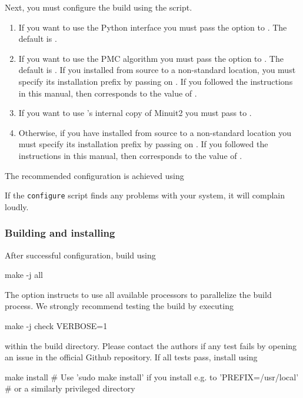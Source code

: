 Next, you must configure the \EOS build using the  script.
\begin{enumerate}
    \item If you want to use the \EOS Python interface you must pass the  option
    to . The default is .

    \item If you want to use the \EOS \gls{PMC} algorithm you must pass the  option
    to . The default is .
    If you installed  from source to a non-standard location,
    you must specify its installation prefix by passing on
    . If you followed the instructions in this
    manual, then  corresponds to the value of .

    \item If you want to use 's internal copy of Minuit2 you must
    pass  to .

    \item Otherwise, if you have installed  from source to a non-standard location
    you must specify its installation prefix by passing on
    . If you followed the instructions in this
    manual, then  corresponds to the value of .
\end{enumerate}
%
The recommended configuration is achieved using
If the \texttt{configure} script finds any problems with your system, it will complain loudly.\\

\subsubsection{Building and installing}
After successful configuration, build \EOS using
%
\begin{commandline}
make -j all
\end{commandline}
The  option instructs  to use all available processors to parallelize
the build process.
%
We strongly recommend testing the build by executing
%
\begin{commandline}
make -j check VERBOSE=1
\end{commandline}
%
within the build directory. Please contact the authors if any
test fails by opening an issue in the official
\EOS Github repository. If all tests pass, install \EOS using
\begin{commandline}
make install # Use 'sudo make install' if you install e.g. to 'PREFIX=/usr/local'
             # or a similarly privileged directory
\end{commandline}

